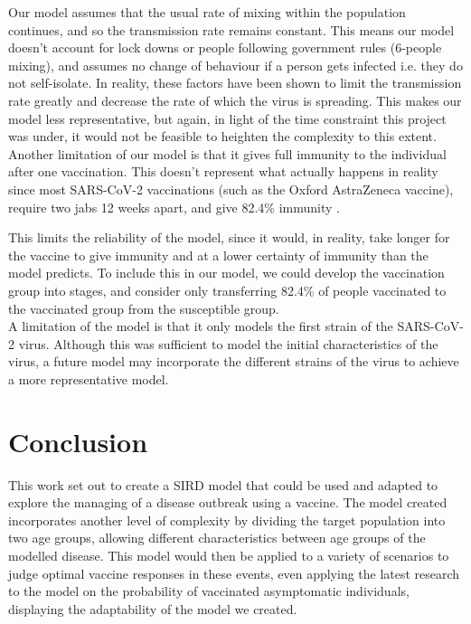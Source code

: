 \documentclass{article}
\begin{document}
\noindent
Our model assumes that the usual rate of mixing within the population continues, and so the transmission rate remains constant. This means our model doesn't account for lock downs or people following government rules (6-people mixing), and assumes no change of behaviour if a person gets infected i.e. they do not self-isolate. In reality, these factors have been shown to limit the transmission rate greatly and decrease the rate of which the virus is spreading. This makes our model less representative, but again, in light of the time constraint this project was under, it would not be feasible to heighten the complexity to this extent.\\

\noindent
Another limitation of our model is that it gives full immunity to the individual after one vaccination. This doesn't represent what actually happens in reality since most SARS-CoV-2 vaccinations (such as the Oxford AstraZeneca vaccine), require two jabs 12 weeks apart, and give 82.4\% immunity \cite{astravaccine}. 

This limits the reliability of the model, since it would, in reality, take longer for the vaccine to give immunity and at a lower certainty of immunity than the model predicts. To include this in our model, we could develop the vaccination group into stages, and consider only transferring 82.4\% of people vaccinated to the vaccinated group from the susceptible group. \\

\noindent
A limitation of the model is that it only models the first strain of the SARS-CoV-2 virus. Although this was sufficient to model the initial characteristics of the virus, a future model may incorporate the different strains of the virus to achieve a more representative model. 

\section{Conclusion}
This work set out to create a SIRD model that could be used and adapted to explore the managing of a disease outbreak using a vaccine. The model created incorporates another level of complexity by dividing the target population into two age groups, allowing different characteristics between age groups of the modelled disease. This model would then be applied to a variety of scenarios to judge optimal vaccine responses in these events, even applying the latest research to the model on the probability of vaccinated asymptomatic individuals, displaying the adaptability of the model we created. \\
\end{document}

